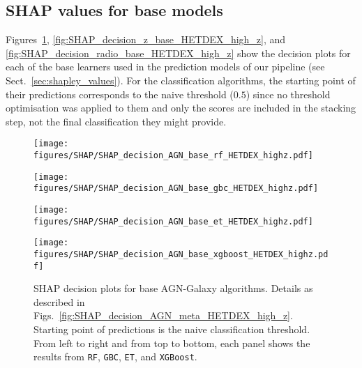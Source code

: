 \documentclass{aa}
\begin{document}
\begin{appendix}
\section{SHAP values for base models}\label{sec:app_shap_base}

Figures~\ref{fig:SHAP_decision_AGN_base_HETDEX_high_z}, \ref{fig:SHAP_decision_z_base_HETDEX_high_z}, and \ref{fig:SHAP_decision_radio_base_HETDEX_high_z} show the decision plots for each of the base learners used in the prediction models of our pipeline (see Sect.~\ref{sec:shapley_values}). For the classification algorithms, the starting point of their predictions corresponds to the naive threshold ($0.5$) since no threshold optimisation was applied to them and only the scores are included in the stacking step, not the final classification they might provide.

\begin{figure}
  \centering
  \begin{minipage}{0.49\columnwidth}
    \centering
    \texttt{[image: figures/SHAP/SHAP\_decision\_AGN\_base\_rf\_HETDEX\_highz.pdf]}
  \end{minipage}%
  \hfill
  \begin{minipage}{0.49\columnwidth}
    \centering
    \texttt{[image: figures/SHAP/SHAP\_decision\_AGN\_base\_gbc\_HETDEX\_highz.pdf]}
  \end{minipage}\break%
  \begin{minipage}{0.49\columnwidth}
    \centering
    \texttt{[image: figures/SHAP/SHAP\_decision\_AGN\_base\_et\_HETDEX\_highz.pdf]}
  \end{minipage}%
  \hfill
  \begin{minipage}{0.49\columnwidth}
    \centering
    \texttt{[image: figures/SHAP/SHAP\_decision\_AGN\_base\_xgboost\_HETDEX\_highz.pdf]}
  \end{minipage}
  \caption{SHAP decision plots for base AGN-Galaxy algorithms. Details as described in Figs.~\ref{fig:SHAP_decision_AGN_meta_HETDEX_high_z}. Starting point of predictions is the naive classification threshold. From left to right and from top to bottom, each panel shows the results from \texttt{RF}, \texttt{GBC}, \texttt{ET}, and \texttt{XGBoost}.}
  \label{fig:SHAP_decision_AGN_base_HETDEX_high_z}
\end{figure}


\end{appendix}
\end{document}
